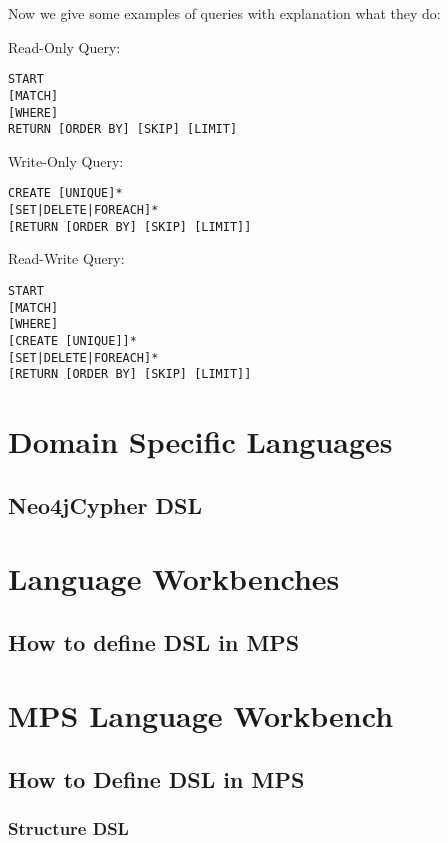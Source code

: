 Now we give some examples of queries with explanation what they do:

Read-Only Query:
\lstset{language=SQL}
\begin{lstlisting}
START
[MATCH]
[WHERE]
RETURN [ORDER BY] [SKIP] [LIMIT]
\end{lstlisting}

Write-Only Query:
\begin{lstlisting}
CREATE [UNIQUE]*
[SET|DELETE|FOREACH]*
[RETURN [ORDER BY] [SKIP] [LIMIT]]
\end{lstlisting}  


Read-Write Query:
\begin{lstlisting}
START
[MATCH]
[WHERE]
[CREATE [UNIQUE]]*
[SET|DELETE|FOREACH]*
[RETURN [ORDER BY] [SKIP] [LIMIT]]
\end{lstlisting}
	

\section{Domain Specific Languages}

	\subsection{Neo4jCypher DSL}



\section{Language Workbenches}

	\subsection{How to define DSL in MPS}



\section{MPS Language Workbench}

	\subsection{How to Define DSL in MPS}

		\subsubsection{Structure DSL}
